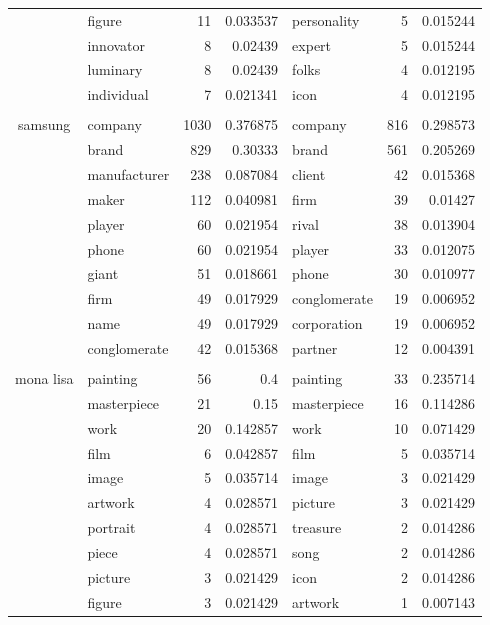 \begin{table*}[htbp!]
\begin{tabular}{llrrlrr}
    \multicolumn{1}{c}{} & figure & 11    & 0.033537 & personality & 5     & 0.015244 \\
    \multicolumn{1}{c}{} & innovator & 8     & 0.02439 & expert & 5     & 0.015244 \\
    \multicolumn{1}{c}{} & luminary & 8     & 0.02439 & folks & 4     & 0.012195 \\
    \multicolumn{1}{c}{} & individual & 7     & 0.021341 & icon  & 4     & 0.012195 \\
          &       &       &       &       &       &  \\
    \multicolumn{1}{c}{\multirow{10}[0]{*}{samsung}} & company & 1030  & 0.376875 & company & 816   & 0.298573 \\
    \multicolumn{1}{c}{} & brand & 829   & 0.30333 & brand & 561   & 0.205269 \\
    \multicolumn{1}{c}{} & manufacturer & 238   & 0.087084 & client & 42    & 0.015368 \\
    \multicolumn{1}{c}{} & maker & 112   & 0.040981 & firm  & 39    & 0.01427 \\
    \multicolumn{1}{c}{} & player & 60    & 0.021954 & rival & 38    & 0.013904 \\
    \multicolumn{1}{c}{} & phone & 60    & 0.021954 & player & 33    & 0.012075 \\
    \multicolumn{1}{c}{} & giant & 51    & 0.018661 & phone & 30    & 0.010977 \\
    \multicolumn{1}{c}{} & firm  & 49    & 0.017929 & conglomerate & 19    & 0.006952 \\
    \multicolumn{1}{c}{} & name  & 49    & 0.017929 & corporation & 19    & 0.006952 \\
    \multicolumn{1}{c}{} & conglomerate & 42    & 0.015368 & partner & 12    & 0.004391 \\
          &       &       &       &       &       &  \\
    \multicolumn{1}{c}{\multirow{10}[0]{*}{mona lisa}} & painting & 56    & 0.4   & painting & 33    & 0.235714 \\
    \multicolumn{1}{c}{} & masterpiece & 21    & 0.15  & masterpiece & 16    & 0.114286 \\
    \multicolumn{1}{c}{} & work  & 20    & 0.142857 & work  & 10    & 0.071429 \\
    \multicolumn{1}{c}{} & film  & 6     & 0.042857 & film  & 5     & 0.035714 \\
    \multicolumn{1}{c}{} & image & 5     & 0.035714 & image & 3     & 0.021429 \\
    \multicolumn{1}{c}{} & artwork & 4     & 0.028571 & picture & 3     & 0.021429 \\
    \multicolumn{1}{c}{} & portrait & 4     & 0.028571 & treasure & 2     & 0.014286 \\
    \multicolumn{1}{c}{} & piece & 4     & 0.028571 & song  & 2     & 0.014286 \\
    \multicolumn{1}{c}{} & picture & 3     & 0.021429 & icon  & 2     & 0.014286 \\
    \multicolumn{1}{c}{} & figure & 3     & 0.021429 & artwork & 1     & 0.007143 \\
    \bottomrule


\end{tabular}
\end{table*}
